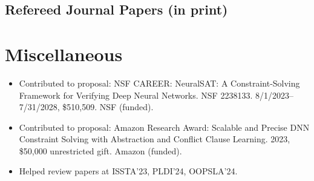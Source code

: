 \documentclass[11pt]{article}
\begin{document}
\subsection{Refereed Journal Papers (in print)}

    \begin{enumerate}[label=J\arabic*]
    \end{enumerate}

\section{Miscellaneous}
\begin{itemize}
    \item Contributed to proposal: NSF CAREER: NeuralSAT: A Constraint-Solving Framework for Verifying Deep Neural Networks. NSF 2238133. 8/1/2023–7/31/2028, \$510,509. NSF (funded).
    \item Contributed to proposal: Amazon Research Award: Scalable and Precise DNN Constraint Solving with Abstraction and Conflict Clause Learning. 2023, \$50,000 unrestricted gift. Amazon (funded).
    \item Helped review papers at ISSTA'23, PLDI'24, OOPSLA'24.
\end{itemize}

\updateinfo{}
\end{document}
